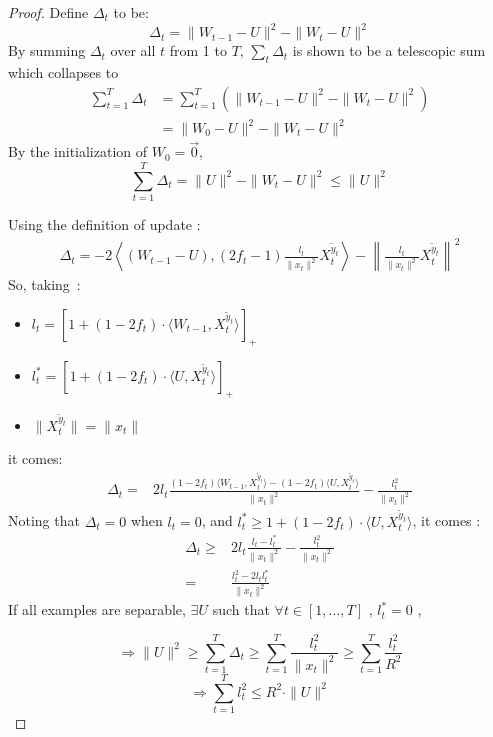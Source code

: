 \documentclass[preprint,12pt,authoryear]{elsarticle}
\begin{document}
\begin{proof}
	Define $\Delta_t$ to be:
	\[\Delta_t = \parallel{W_{t-1}-U}\parallel^2-\parallel{W_t-U}\parallel^2\]
	By summing $\Delta_t$ over all $t$ from 1 to $T$,  $\sum_t \Delta_t$ is shown to be a telescopic sum which collapses to
	\begin{align}
	\sum_{t=1}^{T}\Delta_t &= \sum_{t=1}^{T} \left( \parallel{W_{t-1} - U}\parallel^2-\parallel{W_t - U}\parallel^2 \right)\nonumber\\ 
	&= \parallel{W_0 - U}\parallel^2-\parallel{W_t-U}\parallel^2\nonumber
	\end{align}	
	By the initialization of $W_0 = \vec{0}$, 
	\begin{equation}
	\label{equa:delta}
	\sum_{t=1}^{T}\Delta_t = \parallel{U}\parallel^2 - \parallel{W_t-U}\parallel^2 \leqslant \parallel{U}\parallel^2 
	\end{equation}
	
	Using the definition of update : %
	\begin{align}
	\Delta_t = -2\left\langle (W_{t-1} - U), (2f_t-1)\frac{l_t}{\parallel{x_t}\parallel^2}X_t^{\tilde{y}_t}\right\rangle 
	- \left\| \frac{l_t}{\parallel{x_t}\parallel^2}X_t^{\tilde{y}_t}\right\|^2
	\nonumber
	\end{align}
	So, taking~:
	\begin{itemize}
		\item[] $l_t = [1+(1-2f_t)\cdot\langle W_{t-1},X_t^{\tilde{y}_t}\rangle]_+$
		\item[] $l_t^{\ast} = [1+(1-2f_t)\cdot\langle U,X_t^{\tilde{y}_t}\rangle]_+$
		\item[] $\parallel{X_t^{\tilde{y}_t}}\parallel = \parallel x_t\parallel$
	\end{itemize}
	it comes:
	\begin{align}
	\Delta_t =& 2l_t\frac{(1-2f_t)\langle W_{t-1}, X_t^{\tilde{y}_t}\rangle - (1-2f_t)\langle U, X_t^{\tilde{y}_t}\rangle}{\|x_t\|^2}
	-\frac{l_t^2}{\parallel{x_t}\parallel^2}\nonumber
	\end{align}
	Noting that $\Delta_t = 0$ when $l_t = 0$, and $l^*_t \geq  1+(1-2f_t)\cdot\langle U,X_t^{\tilde{y}_t}\rangle$, it comes : 
	\begin{align}
	\Delta_t\geqslant& 2l_t\frac{l_t - l_t^{\ast}}{\parallel{x_t}\parallel^2}-\frac{l_t^2}{\parallel{x_t}\parallel^2}\nonumber\\
	=& \frac{l_t^2-2l_t l_t^{\ast}}{\parallel x_t\parallel^2}\nonumber
	\end{align}
	If all examples are separable, $\exists U$ such that $\forall t \in [1,...,T]$ , $l_t^{\ast} = 0$ ,
	
	\[\Rightarrow \parallel{U}\parallel^2 \geqslant \sum_{t=1}^{T}\Delta_t \geqslant \sum_{t=1}^{T}  \frac{l_t^2}{\parallel{x_t}\parallel^2}
	\geqslant 
	\sum_{t=1}^{T}  \frac{l_t^2}{R^2}
	\]
	\[\Rightarrow\sum_{t=1}^{T} l_t^2 \leqslant R^2 \cdot \parallel{U}\parallel^2\]
\end{proof}
\end{document}
